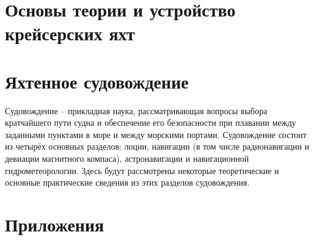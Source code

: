 \documentclass[a4paper, 12pt, twoside, final, book, russian, fittopage, cyremdash, openright]{ncc}
\begin{document}
\part{Основы теории и устройство крейсерских яхт}






\part{Яхтенное судовождение}

Судовождение \--- прикладная наука, рассматривающая вопросы выбора
кратчайшего пути судна и обеспечение его безопасности при плавании
между заданными пунктами в море и между морскими портами. Судовождение
состоит из четырёх основных разделов: лоции, навигации (в том числе
радионавигации и девиации магнитного компаса), астронавигации и
навигационной гидрометеорологии. Здесь будут рассмотрены некоторые
теоретические и основные практические сведения из этих разделов
судовождения.








\part{Приложения}






\printindex
\end{document}
